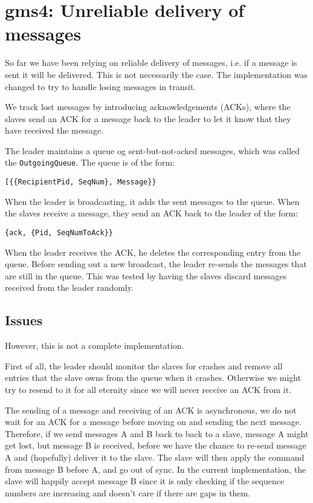 \documentclass[a4paper, 11pt]{article}
\begin{document}
\section{gms4: Unreliable delivery of messages}

So far we have been relying on reliable delivery of messages, i.e. if a message is sent it will be delivered. This is not necessarily the case. The implementation was changed to try to handle losing messages in transit.

We track lost messages by introducing acknowledgements (ACKs), where the slaves send an ACK for a message back to the leader to let it know that they have received the message.

The leader maintains a queue og sent-but-not-acked messages, which was called the \texttt{OutgoingQueue}. The queue is of the form:
\begin{verbatim} 
[{{RecipientPid, SeqNum}, Message}} 
\end{verbatim}

When the leader is broadcasting, it adds the sent messages to the queue. When the slaves receive a message, they send an ACK back to the leader of the form: 
\begin{verbatim}
{ack, {Pid, SeqNumToAck}}
\end{verbatim}

When the leader receives the ACK, he deletes the corresponding entry from the queue. Before sending out a new broadcast, the leader re-sends the messages that are still in the queue. This was tested by having the slaves discard messages received from the leader randomly.

\subsection{Issues}

However, this is not a complete implementation. 

First of all, the leader should monitor the slaves for crashes and remove all entries that the slave owns from the queue when it crashes. Otherwise we might try to resend to it for all eternity since we will never receive an ACK from it.

The sending of a message and receiving of an ACK is asynchronous, we do not wait for an ACK for a message before moving on and sending the next message. Therefore, if we send messages A and B back to back to a slave, message A might get lost, but message B is received, before we have the chance to re-send message A and (hopefully) deliver it to the slave. The slave will then apply the command from message B before A, and go out of sync. In the current implementation, the slave will happily accept message B since it is only checking if the sequence numbers are increasing and doesn't care if there are gaps in them.
\end{document}
